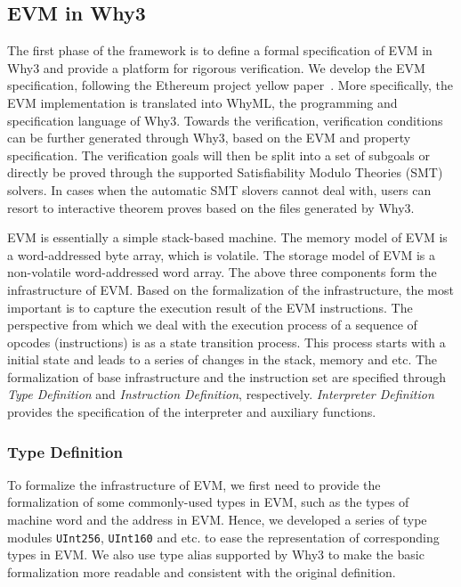 \documentclass[runningheads]{llncs}
\begin{document}
\subsection{EVM in Why3}
The first phase of the framework is to define a formal specification of EVM in Why3 and provide a platform for rigorous verification.  
We develop the EVM specification, following the Ethereum project yellow paper~\cite{wood2014ethereum}. More specifically, the EVM implementation is translated into WhyML, the programming and specification language of Why3. Towards the verification, verification conditions can be further generated through Why3, based on the EVM and property specification. The verification goals will then be split into a set of subgoals or directly be proved through the supported Satisfiability Modulo Theories (SMT) solvers. In cases when the automatic SMT slovers cannot deal with, users can resort to interactive theorem proves based on the files generated by Why3.

EVM is essentially a simple stack-based machine. The memory model of EVM is a word-addressed byte array, which is volatile. The storage model of EVM is a non-volatile word-addressed word array. The above three components form the infrastructure of EVM. Based on the formalization of the infrastructure, the most important is to capture the execution result of the EVM instructions. The perspective from which we deal with the execution process of a sequence of opcodes (instructions) is as a state transition process. This process starts with a initial state and leads to a series of changes in the stack, memory and etc. The formalization of base infrastructure and the instruction set are specified through \textit{Type Definition} and \textit{Instruction Definition}, respectively. \textit{Interpreter Definition} provides the specification of the interpreter and auxiliary functions. 

\subsubsection{Type Definition}\label{sec:type}

To formalize the infrastructure of EVM, we first need to provide the formalization of some commonly-used types in EVM, such as the types of machine word and the address in EVM. Hence, we developed a series of type modules \texttt{UInt256}, \texttt{UInt160} and etc. to ease the representation of corresponding types in EVM. We also use type alias supported by Why3 to make the basic formalization more readable and consistent with the original definition. 
\end{document}

